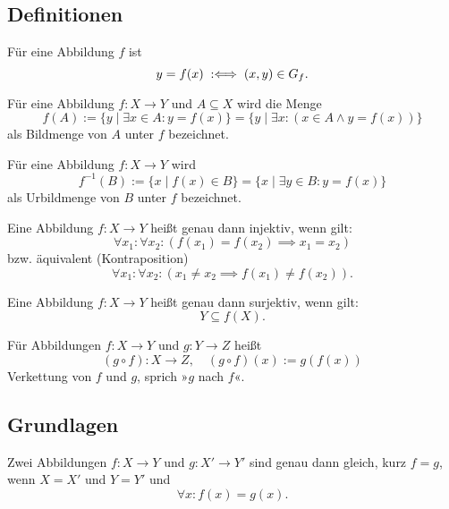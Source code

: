 \subsection{Definitionen}

\begin{Definition}\label{def:app}
Für eine Abbildung $f$ ist
\[y=f(x)\;:\Longleftrightarrow\; (x,y)\in G_f.\]
\end{Definition}

\begin{Definition}%
\label{def:img}\newlinefirst
Für eine Abbildung $f\colon X\to Y$ und $A\subseteq X$
wird die Menge
\[f(A) := \{y\mid \exists x\in A\colon y=f(x)\}
= \{y\mid \exists x\colon (x\in A\land y=f(x))\}\]
als Bildmenge von $A$ unter $f$ bezeichnet.
\end{Definition}

\begin{Definition}\label{def:preimg}
Für eine Abbildung $f\colon X\to Y$ wird
\[f^{-1}(B) := \{x\mid f(x)\in B\} = \{x\mid \exists y\in B\colon y=f(x)\}\]
als Urbildmenge von $B$ unter $f$ bezeichnet.
\end{Definition}

\begin{Definition}%
\label{def:inj}\newlinefirst
Eine Abbildung $f\colon X\to Y$ heißt genau dann injektiv, wenn gilt:
\[\forall x_1\colon \forall x_2\colon (f(x_1)=f(x_2)\implies x_1=x_2)\]
bzw. äquivalent (Kontraposition)
\[\forall x_1\colon \forall x_2\colon (x_1\ne x_2\implies f(x_1)\ne f(x_2)).\]
\end{Definition}

\begin{Definition}%
\label{def:sur}\newlinefirst
Eine Abbildung $f\colon X\to Y$ heißt genau dann surjektiv, wenn gilt:
\[Y\subseteq f(X).\]
\end{Definition}

\begin{Definition}\label{def:composition}%
\newlinefirst
Für Abbildungen $f\colon X\to Y$ und $g\colon Y\to Z$ heißt
\[(g\circ f)\colon X\to Z,\quad (g\circ f)(x):=g(f(x))\]
Verkettung von $f$ und $g$, sprich »$g$ nach $f$«.
\end{Definition}

\subsection{Grundlagen}
\begin{Satz}%
\label{feq}
Zwei Abbildungen $f\colon X\to Y$ und $g\colon X'\to Y'$ sind genau
dann gleich, kurz $f=g$, wenn $X=X'$ und $Y=Y'$ und
\[\forall x\colon f(x)=g(x).\]
\end{Satz}

